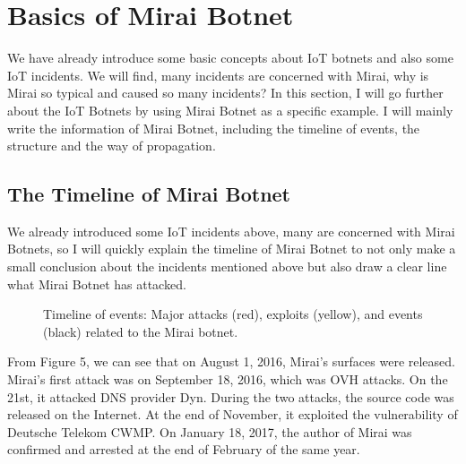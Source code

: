 \documentclass[conference]{IEEEtran}
\begin{document}



\section{\textbf{Basics of  Mirai Botnet}}
We have already introduce some basic concepts about IoT botnets and also some IoT incidents. We will find, many incidents are concerned with Mirai, why is Mirai so typical and caused so many incidents?  In this section, I will go further about the IoT Botnets by using Mirai Botnet as a specific example. I will mainly write the information of Mirai Botnet, including the timeline of events, the structure and the way of propagation.


\subsection{\textbf{The Timeline of Mirai Botnet }}

We already introduced some IoT incidents above, many are concerned with Mirai Botnets, so I will quickly explain the timeline of Mirai Botnet to not only make a small conclusion about the incidents mentioned above but also draw a clear line what Mirai Botnet has attacked.
\begin{figure}[htbp]
{}
\caption{Timeline of events: Major attacks (red), exploits (yellow), and events (black) related to the Mirai botnet.\cite{b1}}
\label{fig}
\end{figure}
From Figure 5\cite{b1}, we can see that on August 1, 2016, Mirai’s surfaces were released. Mirai’s first attack was on September 18, 2016, which was OVH attacks. On the 21st, it attacked DNS provider Dyn. During the two attacks, the source code was released on the Internet. At the end of November, it exploited the vulnerability of Deutsche Telekom CWMP. On January 18, 2017, the author of Mirai was confirmed and arrested at the end of February of the same year.
\end{document}
